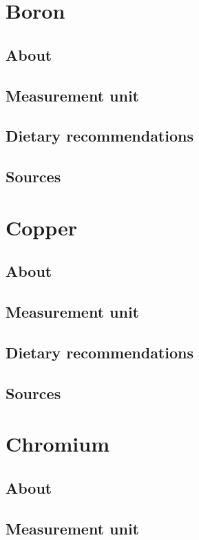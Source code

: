 \documentclass{book}
\begin{document}
\chapter{Boron}
\section{About}


\section{Measurement unit}


\section{Dietary recommendations}


\section{Sources}


\chapter{Copper}
\section{About}


\section{Measurement unit}


\section{Dietary recommendations}


\section{Sources}


\chapter{Chromium}
\section{About}


\section{Measurement unit}
\end{document}
